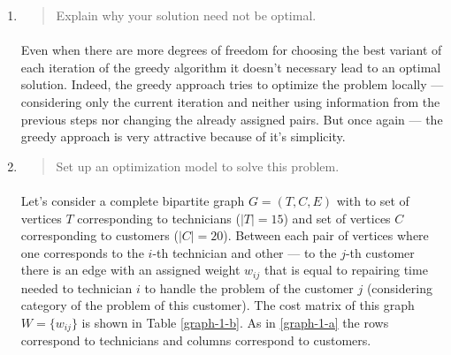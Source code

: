 \begin{enumerate}[(a)]
\begin{enumerate}[1.]
\item\begin{quote}Explain why your solution need not be optimal.\end{quote}

	\paragraph{}
	Even when there are more degrees of freedom for choosing the best variant of each iteration of the greedy algorithm it doesn't necessary lead to an optimal solution. Indeed, the greedy approach tries to optimize the problem locally --- considering only the current iteration and neither using information from the previous steps nor changing the already assigned pairs. But once again --- the greedy approach is very attractive because of it's simplicity.	

\item\begin{quote}Set up an optimization model to solve this problem.\end{quote}

	\paragraph{}
	Let's consider a complete bipartite graph $G=(T,C,E)$ with to set of vertices $T$ corresponding to technicians ($|T|=15$) and set of vertices $C$ corresponding to customers ($|C|=20$). Between each pair of vertices where one corresponds to the $i$-th technician and other --- to the $j$-th customer there is an edge with an assigned weight $w_{ij}$ that is equal to repairing time needed to technician $i$ to handle the problem of the customer $j$ (considering category of the problem of this customer). The cost matrix of this graph $W=\{w_{ij}\}$ is shown in Table \ref{graph-1-b}. As in \ref{graph-1-a} the rows correspond to technicians and columns correspond to customers.


\end{enumerate}
\end{enumerate}
